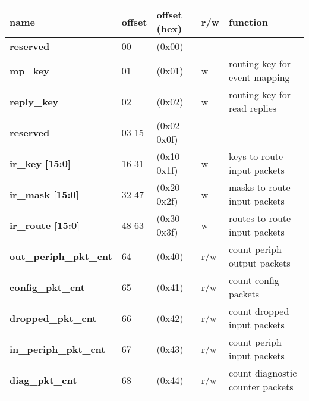 \documentclass[11pt,a4paper,twoside]{article}
\begin{document}
\begin{center}
	\begin{tabularx}{\textwidth}{| p{34mm} p{13mm} p{21mm} p{7mm} X |}
		\hline
		\textbf{name} & \textbf{offset} & \textbf{offset} (hex) & \textbf{r/w} & \textbf{function} \\%
		\hline
		\hline
		\cellcolor{gray!25}\textbf{reserved} & \cellcolor{gray!25}00      & \cellcolor{gray!25}(0x00)      & \cellcolor{gray!25} & \cellcolor{gray!25}\\%
		\textbf{mp\_key}                     & 01                         & (0x01)                         & w                   & routing key for event mapping \\%
		\textbf{reply\_key}                  & 02                         & (0x02)                         & w                   & routing key for read replies \\%
		\cellcolor{gray!25}\textbf{reserved} & \cellcolor{gray!25}03-15   & \cellcolor{gray!25}(0x02-0x0f) & \cellcolor{gray!25} & \cellcolor{gray!25}\\%
		\textbf{ir\_key [15:0]}              & 16-31                      & (0x10-0x1f)                    & w                   & keys to route input packets \\%
		\textbf{ir\_mask [15:0]}             & 32-47                      & (0x20-0x2f)                    & w                   & masks to route input packets \\%
		\textbf{ir\_route [15:0]}            & 48-63                      & (0x30-0x3f)                    & w                   & routes to route input packets \\%
		\textbf{out\_periph\_pkt\_cnt}       & 64                         & (0x40)                         & r/w                 & count periph output packets\\%
		\textbf{config\_pkt\_cnt}            & 65                         & (0x41)                         & r/w                 & count config packets \\%
		\textbf{dropped\_pkt\_cnt}           & 66                         & (0x42)                         & r/w                 & count dropped input packets \\%
		\textbf{in\_periph\_pkt\_cnt}        & 67                         & (0x43)                         & r/w                 & count periph input packets\\%
		\textbf{diag\_pkt\_cnt}              & 68                         & (0x44)                         & r/w                 & count diagnostic counter packets \\%

\end{tabularx}
\end{center}
\end{document}
